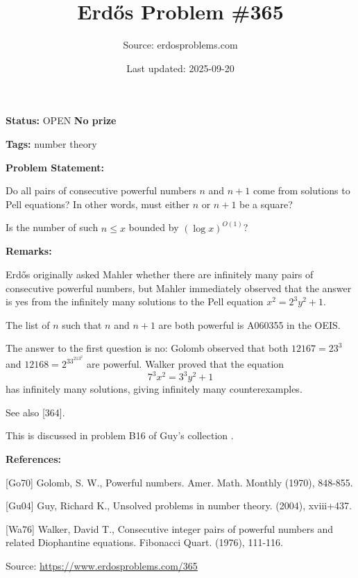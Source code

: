 \documentclass{article}
\title{Erd\H{o}s Problem \#365}
\date{Last updated: 2025-09-20}
\author{Source: erdosproblems.com}
\begin{document}
\maketitle

\noindent\textbf{Status:} OPEN \quad \textbf{No prize}

\noindent\textbf{Tags:} number theory

\medskip
\noindent\textbf{Problem Statement:}

Do all pairs of consecutive powerful numbers $n$ and $n+1$ come from solutions to Pell equations? In other words, must either $n$ or $n+1$ be a square?

Is the number of such $n\leq x$ bounded by $(\log x)^{O(1)}$?

\bigskip
\noindent\textbf{Remarks:}

Erd\H{o}s originally asked Mahler whether there are infinitely many pairs of consecutive powerful numbers, but Mahler immediately observed that the answer is yes from the infinitely many solutions to the Pell equation $x^2=2^3y^2+1$. 

The list of $n$ such that $n$ and $n+1$ are both powerful is A060355 in the OEIS.

The answer to the first question is no: Golomb \cite{Go70} observed that both $12167=23^3$ and $12168=2^33^213^2$ are powerful. Walker \cite{Wa76} proved that the equation\[7^3x^2=3^3y^2+1\]has infinitely many solutions, giving infinitely many counterexamples.

See also [364].

This is discussed in problem B16 of Guy's collection \cite{Gu04}.

\bigskip
\noindent\textbf{References:}

[Go70] Golomb, S. W., Powerful numbers. Amer. Math. Monthly (1970), 848-855.
 
 [Gu04] Guy, Richard K., Unsolved problems in number theory. (2004), xviii+437.
 
 [Wa76] Walker, David T., Consecutive integer pairs of powerful numbers and related
Diophantine equations. Fibonacci Quart. (1976), 111-116.

\bigskip
\noindent\small{Source: \url{https://www.erdosproblems.com/365}}
\end{document}
